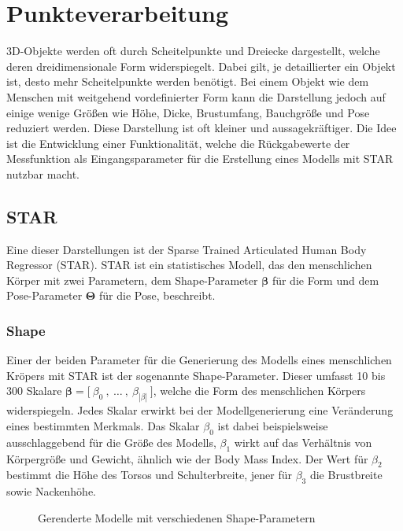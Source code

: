
\newcommand{\irow}[1]{%
\big[ \  #1 \ \big]%
}

\chapter{Punkteverarbeitung}

3D-Objekte werden oft durch Scheitelpunkte und Dreiecke dargestellt, welche deren dreidimensionale Form widerspiegelt.
Dabei gilt, je detaillierter ein Objekt ist, desto mehr Scheitelpunkte werden benötigt. Bei einem Objekt wie dem
Menschen mit weitgehend vordefinierter Form kann die Darstellung jedoch auf einige wenige Größen wie Höhe,
Dicke, Brustumfang, Bauchgröße und Pose reduziert werden. Diese Darstellung ist oft kleiner und aussagekräftiger.
\cite{Ha2018} Die Idee ist die Entwicklung einer Funktionalität, welche die Rückgabewerte der
Messfunktion als Eingangsparameter für die Erstellung eines Modells mit STAR nutzbar macht.

\section{STAR}

Eine dieser Darstellungen ist der Sparse Trained Articulated Human Body Regressor (STAR). 
STAR ist ein statistisches Modell, das den menschlichen Körper mit zwei Parametern, dem Shape-Parameter $\boldsymbol{\beta}$
für die Form und dem Pose-Parameter $\boldsymbol{\Theta}$ für die Pose, beschreibt.

\subsection{Shape}

Einer der beiden Parameter für die Generierung des Modells eines menschlichen Kröpers mit STAR ist der sogenannte Shape-Parameter.
Dieser umfasst 10 bis 300 Skalare \linebreak ${\boldsymbol{\beta}= \irow{\beta _0 \ ,\ \ldots \ , \ \beta_{|\beta|}}}$, welche die
Form des menschlichen Körpers widerspiegeln. Jedes Skalar erwirkt bei der Modellgenerierung eine
Veränderung eines bestimmten Merkmals. Das Skalar $\beta _0$ ist dabei beispielsweise ausschlaggebend
für die Größe des Modells, $\beta _1$ wirkt auf das Verhältnis von Körpergröße und Gewicht, ähnlich wie
der Body Mass Index. Der Wert für $\beta _2$ bestimmt die Höhe des Torsos und Schulterbreite, jener für
$\beta _3$ die Brustbreite sowie Nackenhöhe.
\begin{figure}[H]
  \centering 
   \qquad 
   \qquad 
  \caption{Gerenderte Modelle mit verschiedenen Shape-Parametern} 
  \label{fig:betas}
\end{figure}

